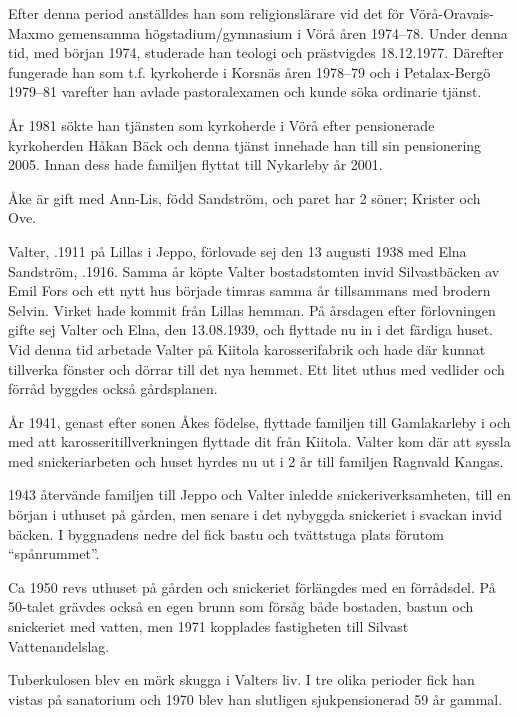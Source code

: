 Efter denna period anställdes han som religionslärare vid det för	Vörå-Oravais-Maxmo gemensamma högstadium/gymnasium i Vörå	åren 1974--78. Under denna tid, med början 1974, studerade han	teologi och prästvigdes 18.12.1977. Därefter fungerade han som t.f.	kyrkoherde i Korsnäs åren 1978--79 och i Petalax-Bergö 1979--81 varefter han avlade pastoralexamen och kunde söka ordinarie tjänst.

År 1981 sökte han tjänsten som kyrkoherde i Vörå efter pensionerade kyrkoherden Håkan Bäck och denna tjänst innehade han till sin pensionering 2005. Innan dess hade familjen flyttat till Nykarleby år 2001.

Åke är gift med Ann-Lis, född Sandström, och paret har 2 söner;	Krister och Ove.


%
Valter, .1911 på Lillas i Jeppo, förlovade sej den 13 augusti 1938 med Elna Sandström, .1916. Samma år köpte Valter bostadstomten invid Silvastbäcken av Emil Fors och ett nytt hus började timras samma år tillsammans med brodern Selvin. Virket hade kommit från Lillas hemman. På årsdagen efter förlovningen gifte sej Valter och Elna, den 13.08.1939, och flyttade nu in i det färdiga huset. Vid denna tid arbetade Valter på Kiitola karosserifabrik och hade där kunnat tillverka fönster och dörrar till det nya hemmet. Ett litet uthus med vedlider och förråd byggdes också gårdsplanen.

År 1941, genast efter sonen Åkes födelse, flyttade familjen till Gamlakarleby i och med att karosseritillverkningen flyttade dit från Kiitola. Valter kom där att syssla med snickeriarbeten och huset hyrdes nu ut i 2 år till familjen Ragnvald Kangas.

1943 återvände familjen till Jeppo och Valter inledde snickeriverksamheten, till en början i uthuset på gården, men senare i det nybyggda snickeriet i svackan invid bäcken. I byggnadens nedre del fick bastu och tvättstuga plats förutom ``spånrummet''.

Ca 1950 revs uthuset på gården och snickeriet förlängdes med en förrådsdel. På 50-talet grävdes också en egen brunn som försåg både bostaden, bastun och snickeriet med vatten, men 1971 kopplades fastigheten till Silvast Vattenandelslag.

Tuberkulosen blev en mörk skugga i Valters liv. I tre olika perioder fick han vistas på sanatorium och 1970 blev han slutligen sjukpensionerad 59 år gammal.

